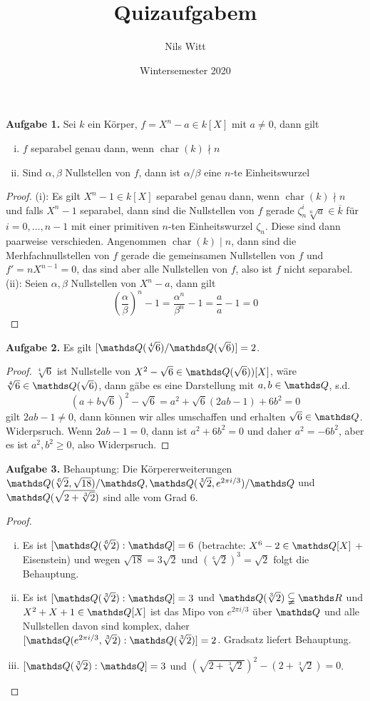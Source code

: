 \documentclass{scrartcl}
\title{Quizaufgabem}
\date{Wintersemester 2020}
\author{Nils Witt}
\begin{document}
\maketitle
\textbf{Aufgabe 1.} Sei $k$ ein Körper, $f=X^n-a\in k[X]$ mit $a\neq 0$, dann gilt
\begin{enumerate}[(i)]
    \item $f$ separabel genau dann, wenn $\operatorname{char}(k)\nmid n$
    \item Sind $\alpha,\beta$ Nullstellen von $f$, dann ist $\alpha/\beta$ eine $n$-te Einheitswurzel
\end{enumerate}
\begin{proof}
    (i): Es gilt $X^n-1\in k[X]$ separabel genau dann, wenn $\operatorname{char}(k)\nmid n$ und falls $X^n-1$ separabel, dann sind die Nullstellen von $f$ gerade $\zeta_n^i\sqrt[n]{a}\in \overline{k}$ für $i=0,\ldots,n-1$ mit einer primitiven $n$-ten Einheitswurzel $\zeta_n$.  
    Diese sind dann paarweise verschieden. Angenommen $\operatorname{char}(k)\mid n$, dann sind die Merhfachnullstellen von $f$ gerade die gemeinsamen Nullstellen von $f$ und $f'=nX^{n-1}=0$, das sind aber alle Nullstellen von $f$, also ist $f$ nicht separabel.
    (ii): Seien $\alpha,\beta$ Nullstellen von $X^n-a$, dann gilt 
    \[
    \left(\frac{\alpha}{\beta}\right)^n-1=\frac{\alpha^n}{\beta^n}-1=\frac{a}{a}-1=0    
    \]
\end{proof}
\textbf{Aufgabe 2.} Es gilt $[\Q(\sqrt[4]{6})/\Q(\sqrt{6})]=2$. 
\begin{proof}
    $\sqrt[4]{6}$ ist Nullstelle von $X^2-\sqrt{6}\in \Q(\sqrt{6}))[X]$, wäre $\sqrt[4]{6}\in \Q(\sqrt{6})$, dann gäbe es eine Darstellung mit $a,b\in \Q$, s.d.
    \[
        (a+b\sqrt{6})^2-\sqrt{6} = a^2+\sqrt{6}(2ab-1)+6b^2 = 0
    \] 
    gilt $2ab-1\neq 0$, dann können wir alles umschaffen und erhalten $\sqrt{6}\in \Q$. Widerpsruch. Wenn $2ab-1=0$, dann ist $a^2+6b^2=0$ und daher $a^2=-6b^2$, aber es ist $a^2,b^2\ge 0$, also Widerpsruch.
\end{proof}
\textbf{Aufgabe 3.} Behauptung: Die Körpererweiterungen $\Q(\sqrt[6]{2},\sqrt{18})/\Q,\Q(\sqrt[3]{2},e^{2\pi i/3})/\Q$ und $\Q(\sqrt{2+\sqrt[3]{2}})$ sind alle vom Grad 6.
\begin{proof}
    \begin{enumerate}[(i)]
        \item Es ist $[\Q(\sqrt[6]{2}):\Q]=6$ (betrachte: $X^6-2\in \Q[X]$ + Eisenstein) und wegen $\sqrt{18}=3\sqrt{2}$ und $(\sqrt[6]{2})^3=\sqrt{2}$ folgt die Behauptung.
        \item Es ist $[\Q(\sqrt[3]{2}):\Q]=3$ und $\Q(\sqrt[3]{2})\subsetneqq \R$ und $X^2+X+1\in \Q[X]$ ist das Mipo von $e^{2\pi i/3}$ über $\Q$ und alle Nullstellen davon sind komplex, daher $[\Q(e^{2\pi i/3},\sqrt[3]{2}):\Q(\sqrt[3]{2})]=2$. Gradsatz liefert Behauptung.
        \item $[\Q(\sqrt[3]{2}):\Q]=3$ und $(\sqrt{2+\sqrt[3]{2}})^2 - (2+\sqrt[3]{2})=0$.
    \end{enumerate}
\end{proof}
\end{document}
